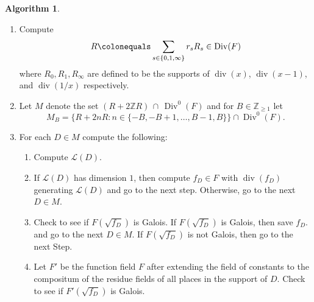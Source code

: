 \documentclass{dcthesis}
\newcommand{\ZZ}{\mathbb Z}
\newcommand{\wt}[1]{\widetilde{#1}}
\DeclareMathOperator{\Div}{Div}
\DeclareMathOperator{\ddiv}{div}
\DeclareMathOperator{\order}{order}
\numberwithin{equation}{section}
\theoremstyle{definition}
\newtheorem{alg}[equation]{Algorithm}
\theoremstyle{remark}
\begin{document}
{{{\begin{alg}
\begin{enumerate}
\begin{align}
\begin{cases}
              \order(\wt{\sigma}_s)\\
              1&
              \text{ if }
              \order(\sigma_s)<
              \order(\wt{\sigma}_s)\\
            \end{cases}
          \end{align}
        \item\label{alg:charzero_getram}
          Compute
          \begin{equation}
            \label{eqn:ramdivisor}
            R\colonequals
            \sum_{s\in\{0,1,\infty\}}r_sR_s
            \in\Div(F)
          \end{equation}
          where
          $R_0,R_1,R_\infty$
          are defined to be the supports
          of
          $\ddiv(x)$,
          $\ddiv(x-1)$,
          and $\ddiv(1/x)$
          respectively.
        \item
          \label{alg:charzero_alldegreezero}
          Let $M$ denote the set
          $(R+2\ZZ R)\,\cap\,\Div^0(F)$
          and for $B\in\ZZ_{\geq 1}$
          let
          \[
            M_B=
            \Big\{R+2nR : n\in 
            \{-B,-B+1,\dots,B-1,B\}\Big\}
            \cap\Div^0(F).
          \]
        \item
          For each $D\in M$ compute the
          following:
          \begin{enumerate}
            \item
              Compute $\mathscr{L}(D)$.
            \item
              If $\mathscr{L}(D)$
              has dimension
              $1$, then compute
              $f_D\in F$ with $\ddiv(f_D)$
              generating $\mathscr{L}(D)$
              and go to the next step.
              Otherwise,
              go to the next $D\in M$.
            \item\label{alg:charzero_isgal}
              Check to see if
              $F(\sqrt{f_D})$ is Galois.
              If $F(\sqrt{f_D})$ is Galois,
              then save $f_D$.
              and go to the next $D\in M$.
              If $F(\sqrt{f_D})$ is not Galois,
              then go to the next Step.
            \item\label{alg:charzero_isgalext}
              Let $F'$ be the function field
              $F$ after extending the field of
              constants to the compositum
              of the residue fields of
              all places in the support of $D$.
              Check to see if
              $F'(\sqrt{f_D})$ is Galois.

\end{enumerate}
\end{enumerate}
\end{alg}}}}
\end{document}
